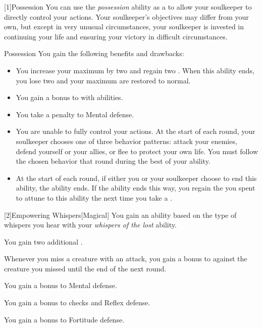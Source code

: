         [1]{Possession} You can use the \textit{possession} ability as a  to allow your soulkeeper to directly control your actions.
        Your soulkeeper's objectives may differ from your own, but except in very unusual circumstances, your soulkeeper is invested in continuing your life and ensuring your victory in difficult circumstances.
        \begin{attuneability}{Possession}
            You gain the following benefits and drawbacks:
            \begin{itemize}
                \item You increase your maximum  by two and regain two .
                    When this ability ends, you lose two  and your maximum  are restored to normal.
                \item You gain a  bonus to  with  abilities.
                \item You take a  penalty to Mental defense.
                \item You are unable to fully control your actions. At the start of each round, your soulkeeper chooses one of three behavior patterns: attack your enemies, defend yourself or your allies, or flee to protect your own life.
                    You must follow the chosen behavior that round during the best of your ability.
                \item At the start of each round, if either you or your soulkeeper choose to end this ability, the ability ends.
                    If the ability ends this way, you regain the  you spent to attune to this ability the next time you take a .
            \end{itemize}
        \end{attuneability}

        [2]{Empowering Whispers}[Magical]
        You gain an ability based on the type of whispers you hear with your \textit{whispers of the lost} ability.
        {
             You gain two additional .

             Whenever you miss a creature with an attack, you gain a  bonus to  against the creature you missed until the end of the next round.

             You gain a  bonus to Mental defense.

             You gain a  bonus to  checks and Reflex defense.

             You gain a  bonus to Fortitude defense.
        }

